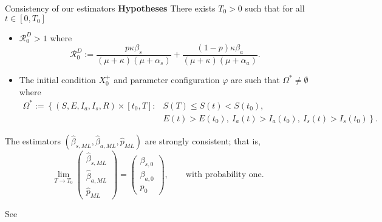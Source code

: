 \begin{frame}{Consistency of our estimators}
\textbf{Hypotheses}
    There exists $T_0>0$ such that for all $t\in [0,T_0]$
     \begin{itemize}[label=()]
         \item
             $\mathcal{R}_0 ^ D > 1$ where 
             $$
                 \mathcal{R}_0^{D}:= 
                 \dfrac{p \kappa \beta_s }{(\mu + \kappa) (\mu + \alpha_s)}
                 +
                 \dfrac{(1 - p) \kappa \beta_a}{
                     (\mu + \kappa)(\mu + \alpha_a)}.
             $$
         \item
            The initial condition $X_0 ^ +$ and parameter configuration 
            $\varphi$ are such that ${\Omega^* \neq  \emptyset}$ where
            \begin{equation*}
                \begin{aligned}
                    \Omega^{*} :=
                    \left \{
                        (S, E, I_a, I_s, R) \times [t_0 , T]:
                    \right.
                    &
                    S(T) \leq S(t) < S(t_0),
                    \\
                     &
                    \left.
                     E(t) > E(t_0), \ 
                     I_a(t) > I_a(t_0), \ 
                     I_s(t) > I_s(t_0)
                     \right \}.
                \end{aligned}
            \end{equation*}
        \end{itemize} 
    \begin{theorem}\label{Consitency-th}
       
        The estimators 
        $(\hat{\beta}_{s,ML},\hat{\beta}_{a,ML},\hat{p}_{ML})$ 
        are  strongly consistent; that is,
        \begin{equation}
            \label{consistency}
            \lim_{T \rightarrow T_0} 
            \begin{pmatrix}
                \hat \beta_{s,ML} 
                \\
                \hat \beta_{a,ML} 
                \\
                \hat p_{ML}
            \end{pmatrix}
            = 
            \begin{pmatrix}
                \beta_{s,0} 
            \\
                \beta_{a,0} 
            \\
                p_0
            \end{pmatrix}, 
            \qquad \mbox{with probability one.}
        \end{equation}
    \end{theorem}
    See \cite{Baltazar2022}
\end{frame}